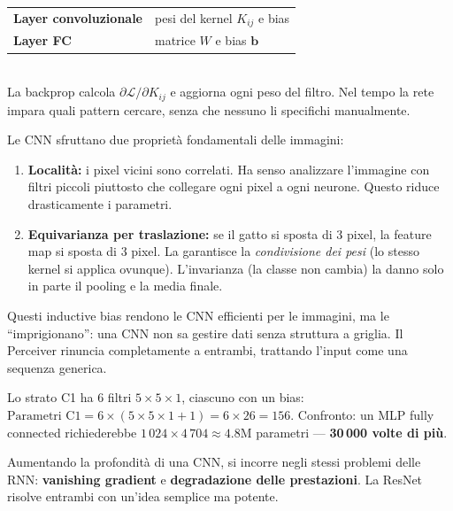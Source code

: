 \documentclass[
  11pt,
]{article}
\begin{document}
\begin{formulabox}[title={\textbf{Cosa si aggiorna durante il training}}]
\begin{tabular}{ll}
\textbf{Layer convoluzionale} & pesi del kernel $K_{ij}$ e bias \\
\textbf{Layer FC} & matrice $W$ e bias $\mathbf{b}$ \\
\end{tabular}\\[4pt]
La backprop calcola $\partial\mathcal{L}/\partial K_{ij}$ e aggiorna ogni peso del filtro. Nel tempo la rete impara quali pattern cercare, senza che nessuno li specifichi manualmente.
\end{formulabox}

\begin{notabox}[title={\textbf{In parole semplici: i due inductive bias delle CNN}}]
Le CNN sfruttano due proprietà fondamentali delle immagini:
\begin{enumerate}
\item \textbf{Località:} i pixel vicini sono correlati. Ha senso analizzare l'immagine con filtri piccoli piuttosto che collegare ogni pixel a ogni neurone. Questo riduce drasticamente i parametri.
\item \textbf{Equivarianza per traslazione:} se il gatto si sposta di 3 pixel, la feature map si sposta di 3 pixel. La garantisce la \emph{condivisione dei pesi} (lo stesso kernel si applica ovunque). L'invarianza (la classe non cambia) la danno solo in parte il pooling e la media finale.
\end{enumerate}
Questi inductive bias rendono le CNN efficienti per le immagini, ma le ``imprigionano'': una CNN non sa gestire dati senza struttura a griglia. Il Perceiver rinuncia completamente a entrambi, trattando l'input come una sequenza generica.
\end{notabox}

\begin{notabox}[title={\textbf{Esempio numerico: conteggio parametri di C1 in LeNet-5}}]
Lo strato C1 ha 6 filtri $5 \times 5 \times 1$, ciascuno con un bias:
$\text{Parametri C1} = 6 \times (5 \times 5 \times 1 + 1) = 6 \times 26 = 156$.
Confronto: un MLP fully connected richiederebbe $1\,024 \times 4\,704 \approx 4.8\text{M}$ parametri --- \textbf{30\,000 volte di più}.
\end{notabox}

\medskip
Aumentando la profondità di una CNN, si incorre negli stessi problemi delle RNN: \textbf{vanishing gradient} e \textbf{degradazione delle prestazioni}. La ResNet risolve entrambi con un'idea semplice ma potente.
\end{document}
